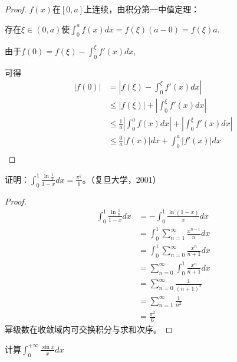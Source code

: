 \begin{proof}
    $f(x)$在$[0,a]$上连续，由积分第一中值定理：
  
  存在$\xi\in(0,a)$使$\int_0^af(x)dx=f(\xi)(a-0)=f(\xi)a.$
  
  由于$f(0)=f(\xi)-\int_0^{\xi}f'(x)dx$,
  
  可得
  \begin{align*}
  |f(0)|&=|f(\xi)-\int_0^{\xi}f'(x)dx|\\
  &\leq|f(\xi)|+|\int_0^{\xi}f'(x)dx|\\
  &\leq\frac{1}{a}|\int_0^af(x)dx|+|\int_0^{\xi}f'(x)dx|\\
  &\leq\frac{0}{a}|f(x)|dx+\int_0^a|f'(x)|dx\\
  \end{align*}
\end{proof}
  
\begin{example}
证明：$\int_0^1\frac{\ln\frac1x}{1-x}dx=\frac{\pi^2}6$。（复旦大学，2001）
\end{example}

\begin{proof}
  \begin{align*}
    \int_0^1\frac{\ln\frac1x}{1-x}dx&=-\int_0^1\frac{\ln(1-x)}{x}dx\\
    &=\int_0^1\sum_{n=1}^{\infty}\frac{x^{n-1}}{n}dx\\
    &=\int_0^1\sum_{n=0}^{\infty}\frac{x^n}{n+1}dx\\
    &=\sum_{n=0}^{\infty}\int_0^1\frac{x^n}{n+1}dx\\
    &=\sum_{n=0}^{\infty}\frac{1}{(n+1)^2}\\
    &=\sum_{n=1}^{\infty}\frac{1}{n^2}\\  
    &=\frac{\pi^2}6
    \end{align*}
    幂级数在收敛域内可交换积分与求和次序。
\end{proof}

\begin{example}
计算$\int_0^{+\infty}\frac{\sin x}xdx$ %
\end{example}

